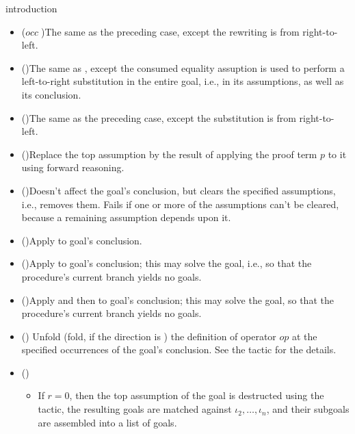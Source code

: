 \begin{tactic}[$\tau$=>$\;\iota_1 \cdots \iota_n$]{introduction}
\begin{tsyntax}[empty]{}
\begin{itemize}
    \item ($\mathit{occ}\;$\ec{<-})\quad The same as the preceding case,
      except the rewriting is from right-to-left.

    \item (\ec{->>})\quad The same as \ec{->}, except the consumed
      equality assuption is used to perform a left-to-right substitution
      in the entire goal, i.e., in its assumptions, as well as its
      conclusion.

    \item (\ec{<<-})\quad The same as the preceding case, except
      the substitution is from right-to-left.

    \item ()\quad Replace the top assumption by the result
    of applying the proof term $p$ to it using forward reasoning.

    \item ()\quad Doesn't affect the goal's
      conclusion, but clears the specified assumptions, i.e., removes
      them. Fails if one or more of the assumptions can't be cleared,
      because a remaining assumption depends upon it.

    \item (\ec{/=})\quad Apply  to goal's conclusion.

    \item (\ec{//})\quad Apply  to goal's conclusion;
      this may solve the goal, i.e., so that the procedure's current
      branch yields no goals.

    \item (\ec{/=})\quad Apply  and then 
      to goal's conclusion; this may solve the goal, so that the
      procedure's current branch yields no goals.

    \item ({})\quad
      Unfold (fold, if the direction is \ec{-}) the definition of
      operator $\mathit{op}$ at the specified occurrences of the
      goal's conclusion. See the  tactic for the
      details.

    \item ()\quad
      \begin{itemize}
      \item If $r=0$, then the top assumption of the goal is destructed
        using the  tactic, the resulting goals are
        matched against $\iota_2,\ldots,\iota_n$, and their subgoals
        are assembled into a list of goals.


\end{itemize}
\end{itemize}
\end{tsyntax}
\end{tactic}
